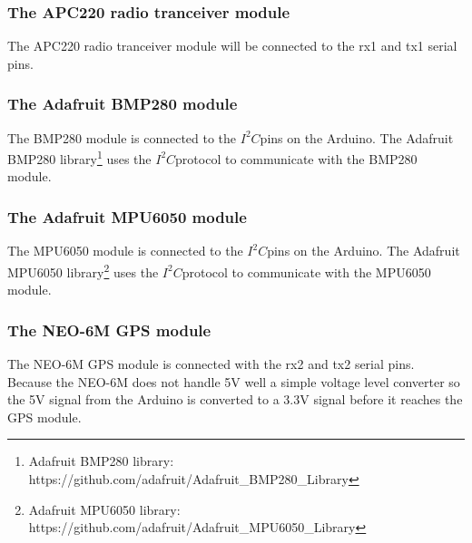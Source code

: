 \documentclass[a4paper,10pt]{article}
\newcommand{\isqc}{$I^2C$}
\begin{document}
			\vspace{1ex}
			
			\subsubsection[APC220]{The APC220 radio tranceiver module}
				The APC220 radio tranceiver module will be connected to the rx1 and tx1 serial pins. 
			
			\vspace{1ex}
			
			\subsubsection[BMP280]{The Adafruit BMP280 module}
				The BMP280 module is connected to the \isqc pins on the Arduino. The Adafruit BMP280 library\footnote{Adafruit BMP280 library: https://github.com/adafruit/Adafruit\_BMP280\_Library} uses the \isqc protocol to communicate with the BMP280 module. 
				
				\vspace{1ex}
			
			\subsubsection[MPU6050]{The Adafruit MPU6050 module}
				The MPU6050 module is connected to the \isqc pins on the Arduino. The Adafruit MPU6050 library\footnote{Adafruit MPU6050 library: https://github.com/adafruit/Adafruit\_MPU6050\_Library} uses the \isqc protocol to communicate with the MPU6050 module. 
				
				\vspace{1ex}
				
			\subsubsection[NEO-6M]{The NEO-6M GPS module}
				The NEO-6M GPS module is connected with the rx2 and tx2 serial pins. \\
				Because the NEO-6M does not handle 5V well a simple voltage level converter so the 5V signal from the Arduino is converted to a 3.3V signal before it reaches the GPS module. 
%						
\end{document}
